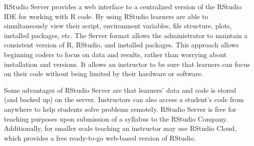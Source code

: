 

RStudio Server provides a web interface to a centralized version of the RStudio IDE for working with R code. By using RStudio learners are able to simultaneously view their script, environment variables, file structure, plots, installed packages, etc. The Server format allows the administrator to maintain a consistent version of R, RStudio, and installed packages. This approach allows beginning coders to focus on data and results, rather than worrying about installation and versions. It allows an instructor to be sure that learners can focus on their code without being limited by their hardware or software.



Some advantages of RStudio Server are that learners' data and code is stored (and backed up) on the server. 
Instructors can also access a student's code from anywhere to help students solve problems remotely.
RStudio Server is free for teaching purposes upon submission of a syllabus to the RStudio Company.
Additionally, for smaller scale teaching an instructor may use RStudio Cloud, which provides a free ready-to-go web-based version of RStudio.

{}

